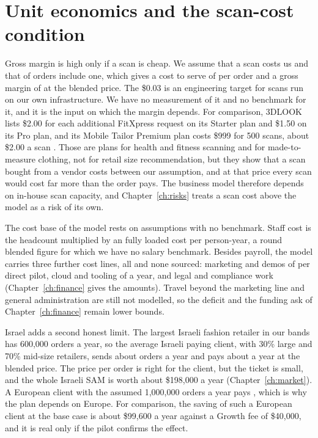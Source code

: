 \section{Unit economics and the scan-cost condition}\label{sec:unit-economics}

Gross margin is high only if a scan is cheap. We assume that a scan costs us  and that  of orders include one, which gives a cost to serve of  per order and a gross margin of  at the blended price. The \$0.03 is an engineering target for scans run on our own infrastructure. We have no measurement of it and no benchmark for it, and it is the input on which the margin depends. For comparison, 3DLOOK lists \$2.00 for each additional FitXpress request on its Starter plan and \$1.50 on its Pro plan, and its Mobile Tailor Premium plan costs \$999 for 500 scans, about \$2.00 a scan \cite{threedlook_pricing}. Those are plans for health and fitness scanning and for made-to-measure clothing, not for retail size recommendation, but they show that a scan bought from a vendor costs between  our assumption, and at that price every scan would cost far more than the order pays. The business model therefore depends on in-house scan capacity, and Chapter~\ref{ch:risks} treats a scan cost above the model as a risk of its own.

The cost base of the model rests on assumptions with no benchmark. Staff cost is the headcount multiplied by an  fully loaded cost per person-year, a round blended figure for which we have no salary benchmark. Besides payroll, the model carries three further cost lines, all  and none sourced: marketing and demos of  per direct pilot, cloud and tooling of  a year, and legal and compliance work (Chapter~\ref{ch:finance} gives the amounts). Travel beyond the marketing line and general administration are still not modelled, so the deficit and the funding ask of Chapter~\ref{ch:finance} remain lower bounds.

Israel adds a second honest limit. The largest Israeli fashion retailer in our bands has 600,000 orders a year, so the average Israeli paying client, with 30\% large and 70\% mid-size retailers, sends about  orders a year and pays about  a year at the blended price. The price per order is right for the client, but the ticket is small, and the whole Israeli SAM is worth about \$198,000 a year (Chapter~\ref{ch:market}). A European client with the assumed 1,000,000 orders a year pays , which is why the plan depends on Europe. For comparison, the saving of such a European client at the base case is about \$99,600 a year against a Growth fee of \$40,000, and it is real only if the pilot confirms the effect.

\ctchapterend
